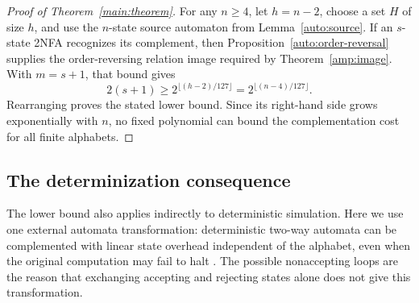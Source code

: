 \begin{proof}[Proof of Theorem~\ref{main:theorem}]
For any $n\geq4$, let $h=n-2$, choose a set $H$ of size $h$, and use
the $n$-state source automaton from Lemma~\ref{auto:source}.
If an $s$-state 2NFA recognizes its complement, then
Proposition~\ref{auto:order-reversal} supplies the order-reversing
relation image required by Theorem~\ref{amp:image}.  With $m=s+1$,
that bound gives
\[
  2(s+1)\geq 2^{\lfloor(h-2)/127\rfloor}
            =2^{\lfloor(n-4)/127\rfloor}.
\]
Rearranging proves the stated lower bound.  Since its right-hand side
grows exponentially with $n$, no fixed polynomial can bound the
complementation cost for all finite alphabets.
\end{proof}

\subsection{The determinization consequence}

The lower bound also applies indirectly to deterministic simulation.
Here we use one external automata transformation: deterministic two-way
automata can be complemented with linear state overhead independent of
the alphabet, even when the original computation may fail to halt
\cite{GeffertMereghettiPighizzini2007}. The possible nonaccepting loops
are the reason that exchanging accepting and rejecting states alone
does not give this transformation.

